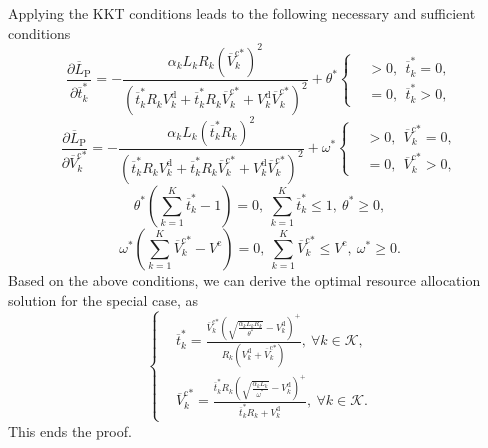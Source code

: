 \documentclass[journal,draftcls,onecolumn,12pt,twoside]{IEEEtran}
\begin{document}
\begin{appendices}
Applying the KKT conditions leads to the following necessary and sufficient conditions
\begin{equation}
    \frac{\partial \overline{L}_{\text{P}}}{\partial \overline{t}_k^*} =
        -\frac{\alpha_k L_k R_k \left(\overline{V}_k^{\text{c}*}\right)^2 }{ \left( \overline{t}_k^* R_k  V_k^{\text{d}} + \overline{t}_k^* R_k \overline{V}_k^{\text{c}*} + V_k^{\text{d}} \overline{V}_k^{\text{c}*} \right)^2} +\theta^*
    \left\{
    \begin{aligned}
        &>0,~~\overline{t}_k^*=0,\\
        &=0,~~\overline{t}_k^*>0,
    \end{aligned}
    \right.\label{48}
\end{equation}
\begin{equation}
    \frac{\partial \overline{L}_{\text{P}}}{\partial \overline{V}_k^{\text{c}*}}=
        -\frac{\alpha_k L_k \left(\overline{t}_k^* R_k \right)^2 }{ \left( \overline{t}_k^* R_k  V_k^{\text{d}} + \overline{t}_k^* R_k \overline{V}_k^{\text{c}*}+V_k^{\text{d}}\overline{V}_k^{\text{c}*} \right)^2} + \omega^*
    \left\{
    \begin{aligned}
        &>0,~~\overline{V}_k^{\text{c}*}=0,\\
        &=0,~~\overline{V}_k^{\text{c}*}>0,
    \end{aligned}
    \right. \label{49}
\end{equation}
\begin{equation}
    \theta^*\left(\sum_{k=1}^K \overline{t}_k^* - 1\right)=0,~\sum_{k=1}^K \overline{t}_k^* \le 1,~\theta^*\ge 0,\label{50}
\end{equation}
\begin{equation}
    \omega^*\left(\sum_{k=1}^K \overline{V}_k^{\text{c}*}- V^{\text{c}}\right)=0,~\sum_{k=1}^K \overline{V}_k^{\text{c}*}\le V^{\text{c}},~\omega^*\ge 0.\label{51}
\end{equation}
Based on the above conditions, we can derive the optimal resource allocation solution for the special case, as
\begin{equation}
	\left\{
    \begin{aligned}
        &\overline{t}_k^* = \frac{\overline{V}_k^{\text{c}*}\left(\sqrt{\frac{\alpha_k L_k R_k}{\theta^*}}-V_k^{\text{d}} \right)^+}{R_k \left( V_k^{\text{d}} + \overline{V}_k^{\text{c}*} \right)},~\forall
          k \in \mathcal{K},\\
        &\overline{V}_k^{\text{c}*} = \frac{\overline{t}_k^* R_k \left(\sqrt{\frac{\alpha_k L_k}{\omega^*}}-V_k^{\text{d}} \right)^+}{\overline{t}_k^*R_k + V_k^{\text{d}}},~\forall k \in \mathcal{K}.
	\end{aligned}
    \right. \label{52}
\end{equation}
This ends the proof.
\end{appendices}
\end{document}
